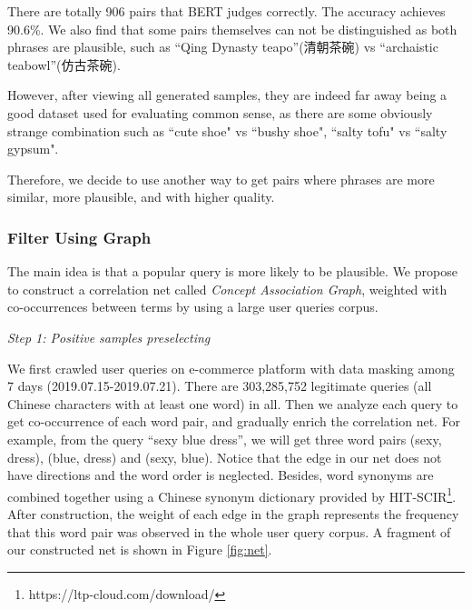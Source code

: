 There are totally 906 pairs that BERT judges correctly. The accuracy achieves 90.6\%. We also find that some pairs themselves can not be distinguished as both phrases are plausible, such as ``Qing Dynasty teapo''(清朝茶碗) vs ``archaistic teabowl''(仿古茶碗). %

However, after viewing all generated samples, %
they are indeed far away being a good dataset used for evaluating common sense, as there are some obviously strange combination such as ``cute shoe" vs ``bushy shoe", ``salty tofu" vs ``salty gypsum". 

Therefore, we decide to use another way to get pairs where phrases are more similar, more plausible, and with higher quality.
\fi


\subsubsection{Filter Using Graph}

The main idea is that a popular query is more likely to be plausible. 
We propose to construct a correlation net called \textit{Concept Association Graph}, weighted with co-occurrences between terms by using a large user queries corpus.

\textit{Step 1: Positive samples preselecting}

We first crawled user queries on e-commerce platform with data masking among 7 days (2019.07.15-2019.07.21). %
There are 303,285,752 legitimate queries (all Chinese characters with at least
one word) in all. Then we analyze each query to get co-occurrence of each word pair, 
and gradually enrich the correlation net.
For example, from the query ``sexy blue dress'', we will get three word pairs 
(sexy, dress), (blue, dress) and (sexy, blue). Notice that the edge in our net does not have directions and the word order is neglected.
Besides, word synonyms are combined together using a Chinese synonym dictionary provided by HIT-SCIR\footnote{https://ltp-cloud.com/download/}.
After construction, the weight of each edge in the graph represents the frequency %
that this word pair was observed in the whole user query corpus. 
A fragment of our constructed net is shown in Figure \ref{fig:net}.

